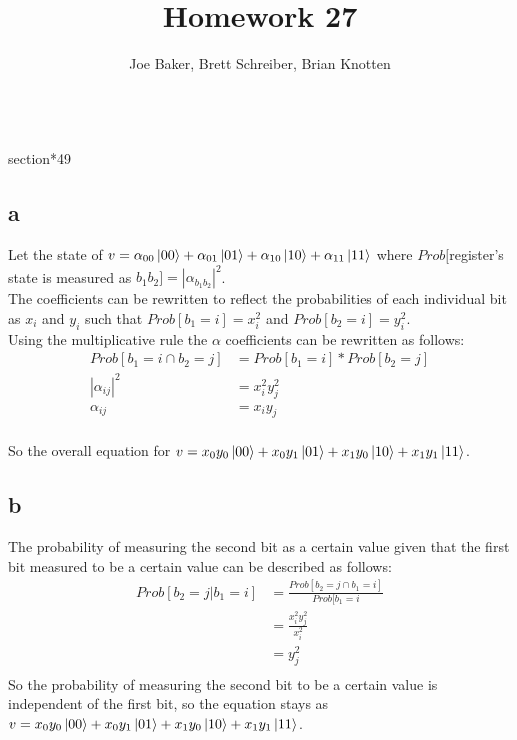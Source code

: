 \documentclass[letterpaper,notitlepage,twoside]{article}
\begin{document}
\title{Homework 27}
\author{Joe Baker, Brett Schreiber, Brian Knotten}
\maketitle

\\section*{49}
\subsection*{a}
Let the state of $v = \alpha_{00}\ket{00} + \alpha_{01}\ket{01} + \alpha_{10}\ket{10} + \alpha_{11}\ket{11}$ where $Prob[$register's state is measured as $b_1b_2] = |\alpha_{b_1b_2}|^2$. \\

The coefficients can be rewritten to reflect the probabilities of each individual bit as $x_i$ and $y_i$ such that $Prob[b_1 = i] = x_i^2$ and $Prob[b_2 = i] = y_i^2$. \\

Using the multiplicative rule the $\alpha$ coefficients can be rewritten as follows: \\
\begin{align*}
Prob[b_1 = i \cap b_2 = j] &= Prob[b_1 = i] * Prob[b_2 = j] \\
|\alpha_{ij}|^2 &= x_i^2y_j^2 \\
\alpha_{ij} &= x_iy_j \\
\end{align*}

So the overall equation for $v = x_0y_0\ket{00} + x_0y_1\ket{01} + x_1y_0\ket{10} + x_1y_1\ket{11}$.

\subsection*{b}
The probability of measuring the second bit as a certain value given that the first bit measured to be a certain value can be described as follows:
\begin{align*}
Prob[b_2 = j | b_1 = i] &= \frac{Prob[b_2 = j \cap b_1 = i]}{Prob[b_1 = i} \\
&= \frac{x_i^2y_j^2}{x_i^2} \\
&= y_j^2 \\
\end{align*}
So the probability of measuring the second bit to be a certain value is independent of the first bit, so the equation stays as $v = x_0y_0\ket{00} + x_0y_1\ket{01} + x_1y_0\ket{10} + x_1y_1\ket{11}$.
\end{document}
